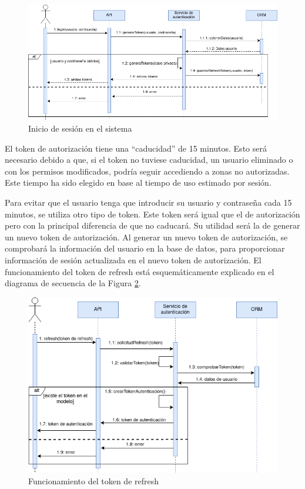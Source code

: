 \begin{figure}[]
    \centering
    \includegraphics[width=\textwidth]{diseno/sistema/DS/login.png}
    \caption{Inicio de sesión en el sistema}
    \label{fig:ds-login}
\end{figure}

El token de autorización tiene una ``caducidad'' de 15 minutos. Esto será necesario debido a que, si el token no tuviese caducidad, un usuario eliminado o con los permisos modificados, podría seguir accediendo a zonas no autorizadas. Este tiempo ha sido elegido en base al tiempo de uso estimado por sesión. 

Para evitar que el usuario tenga que introducir su usuario y contraseña cada 15 minutos, se utiliza otro tipo de token. Este token será igual que el de autorización pero con la principal diferencia de que no caducará. Su utilidad será la de generar un nuevo token de autorización. Al generar un nuevo token de autorización, se comprobará la información del usuario en la base de datos, para proporcionar información de sesión actualizada en el nuevo token de autorización. El funcionamiento del token de refresh está esquemáticamente explicado en el diagrama de secuencia de la Figura \ref{fig:ds-refresh}.

\begin{figure}[]
    \centering
    \includegraphics[width=\textwidth]{diseno/sistema/DS/refresh.png}
    \caption{Funcionamiento del token de refresh}
    \label{fig:ds-refresh}
\end{figure}


